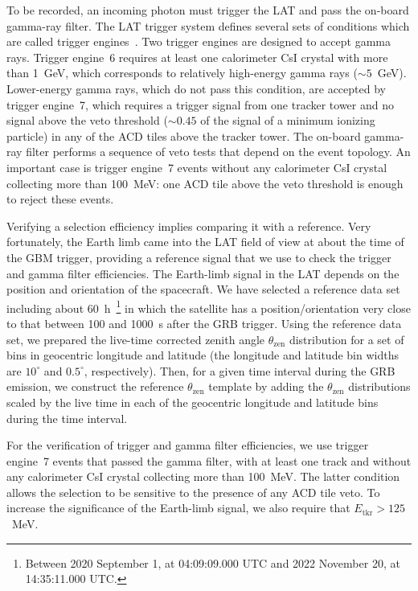 \documentclass[preprint]{aastex631}
\begin{document}
To be recorded, an incoming photon must trigger the LAT and pass the on-board gamma-ray filter. The LAT trigger system defines several sets of conditions which are called trigger engines~\citep{2012ApJS..203....4A}. Two trigger engines are designed to accept gamma rays. Trigger engine~6 requires at least one calorimeter CsI crystal with more than 1~GeV, which corresponds to relatively high-energy gamma rays ($\sim 5$~GeV). Lower-energy gamma rays, which do not pass this condition, are accepted by trigger engine~7, which requires a trigger signal from one tracker tower and no signal above the veto threshold ($\sim 0.45$ of the signal of a minimum ionizing particle) in any of the ACD tiles above the tracker tower. The on-board gamma-ray filter performs a sequence of veto tests that depend on the event topology. An important case is trigger engine~7 events without any calorimeter CsI crystal collecting more than 100~MeV: one ACD tile above the veto threshold is enough to reject these events. 

Verifying a selection efficiency implies comparing it with a reference. Very fortunately, the Earth limb came into the LAT field of view at about the time of the GBM trigger, providing a reference signal that we use to check the trigger and gamma filter efficiencies.
The Earth-limb signal in the LAT depends on the position and orientation of the spacecraft. We have selected a reference data set including about 60~h~\footnote{Between 2020 September 1, at 04:09:09.000 UTC and 2022 November 20, at 14:35:11.000 UTC.} in which the satellite has a position/orientation very close to that between 100 and 1000~s after the GRB trigger. Using the reference data set, we prepared the live-time corrected zenith angle $\theta_\mathrm{zen}$ distribution for a set of bins in geocentric longitude and latitude (the longitude and latitude bin widths are $10^\circ$ and $0.5^\circ$, respectively). Then, for a given time interval during the GRB emission, we construct the reference $\theta_\mathrm{zen}$ template by adding the $\theta_\mathrm{zen}$ distributions scaled by the live time in each of the geocentric longitude and latitude bins during the time interval.

For the verification of trigger and gamma filter efficiencies, we use trigger engine~7 events that passed the gamma filter, with at least one track and without any calorimeter CsI crystal collecting more than 100~MeV. The latter condition allows the selection to be sensitive to the presence of any ACD tile veto. To increase the significance of the Earth-limb signal, we also require that $E_\mathrm{tkr}>125$~MeV.
\end{document}
